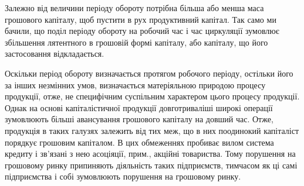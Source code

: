 Залежно від величини періоду обороту потрібна більша або менша
маса грошового капіталу, щоб пустити в рух продуктивний капітал. Так
само ми бачили, що поділ періоду обороту на робочий час і час циркуляції
зумовлює збільшення лятентного в грошовій формі капіталу, або
капіталу, що його застосовання відкладається.

Оскільки період обороту визначається протягом робочого періоду, остільки
його за інших незмінних умов, визначається матеріяльною природою
процесу продукції, отже, не специфічним суспільним характером
цього процесу продукції. Однак на основі капіталістичної продукції довготриваліші
широкі операції зумовлюють більші авансування грошового
капіталу на довший час. Отже, продукція в таких галузях залежить від
тих меж, що в них поодинокий капіталіст порядкує грошовим капіталом.
В цих обмеженнях пробиває вилом система кредиту і зв’язані з нею асоціяції,
прим., акційні товариства. Тому порушення на грошовому ринку
припиняють діяльність таких підприємств, тимчасом як ці самі підприємства
і собі зумовлюють порушення на грошовому ринку.
